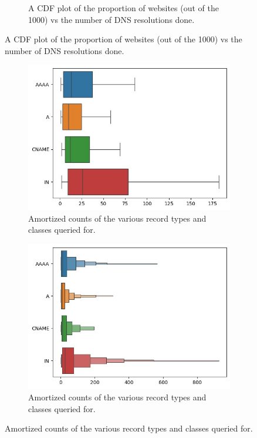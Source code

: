\documentclass{article}
\begin{document}
\begin{figure}[htpb]
\begin{subfigure}[b]{0.48\linewidth}
        \vspace{-7mm}
        \caption{A CDF plot of the proportion of websites (out of the 1000) vs the number of DNS resolutions done.}
        \vspace{-3mm}
        \label{fig:num-res-cdf}
    \end{subfigure}
\end{figure}

\begin{figure}[htpb]
    \centering
    \begin{subfigure}[b]{0.48\linewidth}
        \includegraphics[width=\linewidth]{plots/records-box.jpeg}
        \vspace{-7mm}
        \caption{Amortized counts of the various record types and classes queried for.}
        \vspace{-3mm}
        \label{fig:records-box}
    \end{subfigure}
    \hfill
    \begin{subfigure}[b]{0.48\linewidth}
        \includegraphics[width=\linewidth]{plots/records-boxen.jpeg}
        \vspace{-7mm}
        \caption{Amortized counts of the various record types and classes queried for.}
        \vspace{-3mm}
        \label{fig:records-boxen}
    \end{subfigure}
\end{figure}
\end{document}
